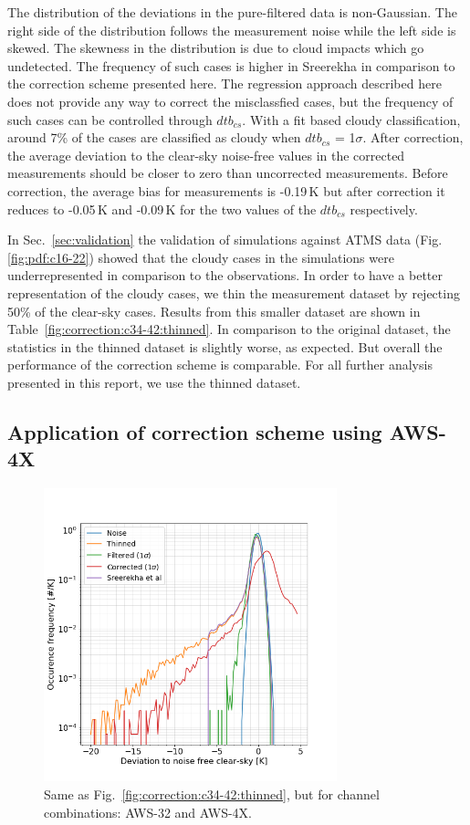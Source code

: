 \documentclass[12pt]{article}
\begin{document}
The distribution of the deviations in the pure-filtered data is non-Gaussian. The
right side of the distribution follows the measurement noise while the left
side is skewed. The skewness in the distribution is due to cloud impacts which
go undetected. The frequency of such cases is higher in Sreerekha in comparison to the correction scheme presented here. The regression approach described here does not provide any way to correct the misclassfied cases, but the frequency of such cases can be controlled through $dtb_{cs}$. With a fit based cloudy classification, around 7\% of the cases are classified as cloudy when $dtb_{cs}$
= 1$\sigma$.  After correction, the average deviation to the clear-sky noise-free
values in the corrected measurements should be closer to zero than uncorrected
measurements. Before correction, the average bias for measurements is -0.19\,K
but after correction it reduces to -0.05\,K and -0.09\,K for the two values of
the $dtb_{cs}$ respectively. 

In Sec.~\ref{sec:validation} the validation of simulations against ATMS data (Fig.\ref{fig:pdf:c16-22}) showed that the cloudy cases in the simulations were underrepresented in comparison to the observations. In order to have a better representation of the cloudy cases, we thin the measurement dataset by rejecting 50\% of the clear-sky cases. Results from this smaller dataset are shown in Table~\ref{fig:correction:c34-42:thinned}. In comparison to the original dataset, the statistics in the thinned dataset is slightly worse, as expected. But overall the performance of the correction scheme is comparable. For all further analysis presented in this report, we use the thinned dataset.
%
\subsection{Application of correction scheme using AWS-4X}
%
\begin{figure}[!t]
	\centering
	\includegraphics[height=85mm]{PDF_corrected_AWS-32_AWS-4X_thinned}
	\caption{Same as Fig.~\ref{fig:correction:c34-42:thinned}, but for channel combinations: AWS-32 and AWS-4X.}
	\label{fig:correction:c32-4X:thinned}
\end{figure}
%
\end{document}
